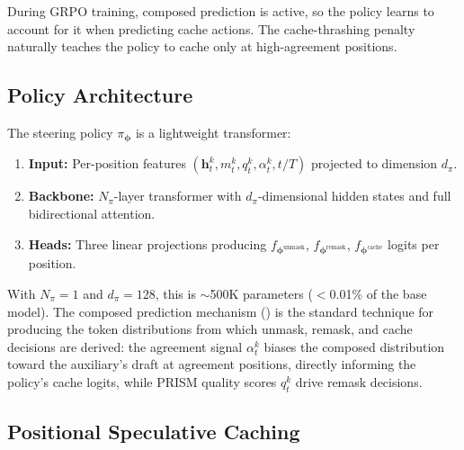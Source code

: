 \documentclass[11pt]{article}
\newcommand{\bphi}{\bm{\phi}}
\newcommand{\bh}{\mathbf{h}}
\begin{document}
During GRPO training, composed prediction is active, so the policy learns to account for it when predicting cache actions.
The cache-thrashing penalty naturally teaches the policy to cache only at high-agreement positions.

\subsection{Policy Architecture}
\label{sec:architecture}

The steering policy $\pi_{\bphi}$ is a lightweight transformer:
\begin{enumerate}[leftmargin=*,itemsep=2pt]
    \item \textbf{Input:} Per-position features $(\bh_t^k, m_t^k, q_t^k, \alpha_t^k, t/T)$ projected to dimension $d_\pi$.
    \item \textbf{Backbone:} $N_\pi$-layer transformer with $d_\pi$-dimensional hidden states and full bidirectional attention.
    \item \textbf{Heads:} Three linear projections producing $f_{\bphi^{\text{unmask}}}$, $f_{\bphi^{\text{remask}}}$, $f_{\bphi^{\text{cache}}}$ logits per position.
\end{enumerate}
With $N_\pi = 1$ and $d_\pi = 128$, this is ${\sim}$500K parameters ($<$0.01\% of the base model).
The composed prediction mechanism () is the standard technique for producing the token distributions from which unmask, remask, and cache decisions are derived: the agreement signal $\alpha_t^k$ biases the composed distribution toward the auxiliary's draft at agreement positions, directly informing the policy's cache logits, while PRISM quality scores $q_t^k$ drive remask decisions.

\subsection{Positional Speculative Caching}
\label{sec:positional_spec_cache}
\end{document}

